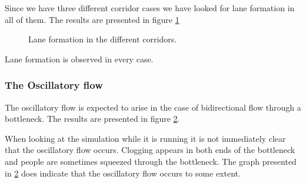 Since we have three different corridor cases we have 
looked for lane formation in all of them. The results are presented in 
figure \ref{fig:laneformation}

\begin{figure}[h]
\centering
\subfloat[]{\resizebox{5cm}{!}{}}
\subfloat[]{\resizebox{5cm}{!}{}}
\subfloat[]{\resizebox{5cm}{!}{}}
\caption{Lane formation in the different corridors.}
\label{fig:laneformation}
\end{figure}

Lane formation is observed in every case.

\subsubsection{The Oscillatory flow}
The oscillatory flow is expected to arise in the case of bidirectional 
flow through a bottleneck. The results are presented in figure
\ref{fig:oscillitoryflow}.

\begin{figure}[h]
\centering
{}
\caption{}
\label{fig:oscillitoryflow}
\end{figure}

When looking at the simulation while it is running it is not 
immediately clear that the oscillatory flow occurs. Clogging 
appears in both ends of the bottleneck and people are sometimes 
squeezed through the bottleneck. The graph presented in 
\ref{fig:oscillitoryflow} does indicate that the oscillatory 
flow occurs to some extent.